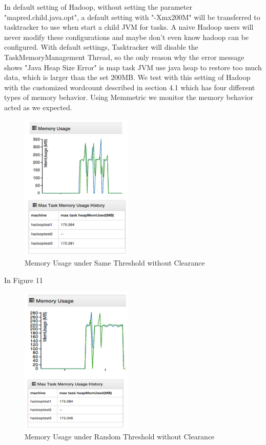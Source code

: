 In default setting of Hadoop, without setting the parameter "mapred.child.java.opt", a default setting with "-Xmx200M" will be transferred to tasktracker to use when start a child JVM for tasks. A naive Hadoop users will never modify these configurations and maybe don't even know hadoop can be configured.
With default settings, Tasktracker will disable the TaskMemoryManagement Thread, so the only reason why the error message shows "Java Heap Size Error" is map task JVM use java heap to restore too much data, which is larger than the set 200MB.
We test with this setting of Hadoop with the customized wordcount described in section 4.1 which has four different types of memory behavior. Using Memmetric we monitor the memory behavior acted as we expected.

\begin{figure}[ht]
  \centering
    \includegraphics[width=2.1in]{image/test1a.png}
    \caption{Memory Usage under Same Threshold without Clearance}
    \label{ref:memory_allocation}
\end{figure}

In Figure 11

\begin{figure}[ht]
  \centering
    \includegraphics[width=2.1in]{image/test1b.png}
    \caption{Memory Usage under Random Threshold without Clearance}
    \label{ref:memory_allocation}
\end{figure}

